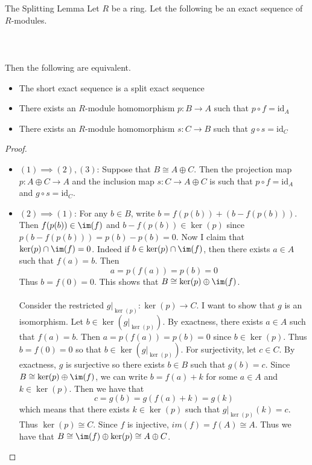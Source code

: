 \documentclass[a4paper]{article}
\begin{document}
\begin{prp}{The Splitting Lemma}{} Let $R$ be a ring. Let the following be an exact sequence of $R$-modules. \\~\\
\\~\\
Then the following are equivalent. 
\begin{itemize}
\item The short exact sequence is a split exact sequence
\item There exists an $R$-module homomorphism $p:B\to A$ such that $p\circ f=\text{id}_A$
\item There exists an $R$-module homomorphism $s:C\to B$ such that $g\circ s=\text{id}_C$
\end{itemize} \tcbline
\begin{proof}~\\
\begin{itemize}
\item $(1)\implies(2),(3)$: Suppose that $B\cong A\oplus C$. Then the projection map $p:A\oplus C\to A$ and the inclusion map $s:C\to A\oplus C$ is such that $p\circ f=\text{id}_A$ and $g\circ s=\text{id}_C$. 

\item $(2)\implies(1)$: For any $b\in B$, write $b=f(p(b))+(b-f(p(b)))$. Then $f(p(b))\in\im(f)$ and $b-f(p(b))\in\ker(p)$ since $p(b-f(p(b)))=p(b)-p(b)=0$. Now I claim that $\ker(p)\cap\im(f)=0$. Indeed if $b\in\ker(p)\cap\im(f)$, then there exists $a\in A$ such that $f(a)=b$. Then $$a=p(f(a))=p(b)=0$$ Thus $b=f(0)=0$. This shows that $B\cong\ker(p)\oplus\im(f)$. \\~\\

Consider the restricted $g|_{\ker(p)}:\ker(p)\to C$. I want to show that $g$ is an isomorphism. Let $b\in\ker\left(g|_{\ker(p)}\right)$. By exactness, there exists $a\in A$ such that $f(a)=b$. Then $a=p(f(a))=p(b)=0$ since $b\in\ker(p)$. Thus $b=f(0)=0$ so that $b\in\ker\left(g|_{\ker(p)}\right)$. For surjectivity, let $c\in C$. By exactness, $g$ is surjective so there exists $b\in B$ such that $g(b)=c$. Since $B\cong\ker(p)\oplus\im(f)$, we can write $b=f(a)+k$ for some $a\in A$ and $k\in\ker(p)$. Then we have that $$c=g(b)=g(f(a)+k)=g(k)$$ which means that there exists $k\in\ker(p)$ such that $g|_{\ker(p)}(k)=c$. Thus $\ker(p)\cong C$. Since $f$ is injective, $im(f)=f(A)\cong A$. Thus we have that $B\cong\im(f)\oplus\ker(p)\cong A\oplus C$. 


\end{itemize}
\end{proof}
\end{prp}
\end{document}
